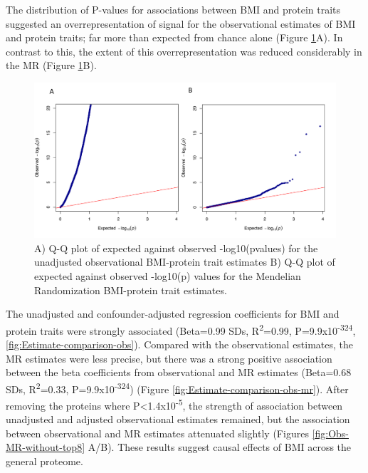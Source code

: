 \documentclass[11pt,twoside]{bristolthesis}
\begin{document}
The distribution of P-values for associations between BMI and protein traits suggested an overrepresentation of signal for the observational estimates of BMI and protein traits; far more than expected from chance alone (Figure \ref{fig:QQ-obs-MR}A). In contrast to this, the extent of this overrepresentation was reduced considerably in the MR (Figure \ref{fig:QQ-obs-MR}B).
\begin{figure}
\includegraphics[width=0.95\linewidth,height=0.6\textheight]{figure/BMI_protein_INTERVAL/QQ_obs_MR} \caption[Q-Q plot of the expected against observed -log10(pvalues) for BMI-protein estimates]{A) Q-Q plot of expected against observed -log10(pvalues) for the unadjusted observational BMI-protein trait estimates B) Q-Q plot of expected against observed -log10(p) values for the Mendelian Randomization BMI-protein trait estimates.}\label{fig:QQ-obs-MR}
\end{figure}
The unadjusted and confounder-adjusted regression coefficients for BMI and protein traits were strongly associated (Beta=0.99 SDs, R\textsuperscript{2}=0.99, P=9.9x10\textsuperscript{-324}, \ref{fig:Estimate-comparison-obs}). Compared with the observational estimates, the MR estimates were less precise, but there was a strong positive association between the beta coefficients from observational and MR estimates (Beta=0.68 SDs, R\textsuperscript{2}=0.33, P=9.9x10\textsuperscript{-324}) (Figure \ref{fig:Estimate-comparison-obs-mr}). After removing the proteins where P\textless1.4x10\textsuperscript{-5}, the strength of association between unadjusted and adjusted observational estimates remained, but the association between observational and MR estimates attenuated slightly (Figures \ref{fig:Obs-MR-without-top8} A/B). These results suggest causal effects of BMI across the general proteome.
\end{document}
